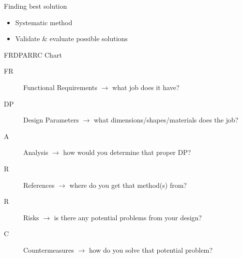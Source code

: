 \documentclass[10pt, svgnames]{beamer}
\begin{document}
\begin{frame}[label={sec:orgd043141}]{Finding best solution}
\begin{itemize}
\item Systematic method
\item Validate \& evaluate possible solutions
\end{itemize}
\end{frame}


\begin{frame}[label={sec:orgf7e989d}]{FRDPARRC Chart}
\begin{description}
\item[{FR}] Functional Requirements \(\rightarrow\) what job does it have?
\item[{DP}] Design Parameters \(\rightarrow\)  what dimensions/shapes/materials does the job?
\item[{A}] Analysis \(\rightarrow\) how would you determine that proper DP?
\item[{R}] References \(\rightarrow\) where do you get that method(s) from?
\item[{R}] Risks \(\rightarrow\) is there any potential problems from your design?
\item[{C}] Countermeasures \(\rightarrow\) how do you solve that potential problem?
\end{description}
\end{frame}
\end{document}
